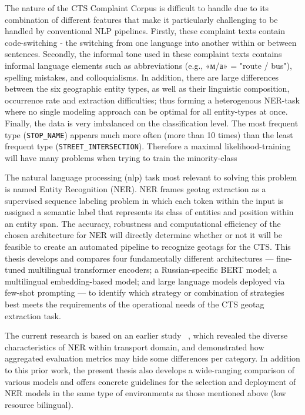 The nature of the CTS Complaint Corpus is difficult to handle due to its combination of different features that make it particularly challenging to be handled by conventional NLP pipelines. Firstly, these complaint texts contain code-switching - the switching from one language into another within or between sentences. Secondly, the informal tone used in these complaint texts contains informal language elements such as abbreviations (e.g., «м/а» = "route / bus"), spelling mistakes, and colloquialisms. In addition, there are large differences between the six geographic entity types, as well as their linguistic composition, occurrence rate and extraction difficulties; thus forming a heterogenous NER-task where no single modeling approach can be optimal for all entity-types at once. Finally, the data is very imbalanced on the classification level. The most frequent type (\texttt{STOP\_NAME}) appears much more often (more than 10 times) than the least frequent type (\texttt{STREET\_INTERSECTION}). Therefore a maximal likelihood-training will have many problems when trying to train the minority-class


The natural language processing (nlp) task most relevant to solving this problem is named Entity Recognition (NER). NER frames geotag extraction as a supervised sequence labeling problem in which each token within the input is assigned a semantic label that represents its class of entities and position within an entity span. The accuracy, robustness and computational efficiency of the chosen architecture for NER will directly determine whether or not it will be feasible to create an automated pipeline to recognize geotags for the CTS. This thesis develops and compares four fundamentally different architectures — fine-tuned multilingual transformer encoders; a Russian-specific BERT model; a multilingual embedding-based model; and large language models deployed via few-shot prompting — to identify which strategy or combination of strategies best meets the requirements of the operational needs of the CTS geotag extraction task.

The current research is based on an earlier study ~\cite{ussenbayeva2026heterogeneous}, which revealed the diverse characteristics of NER within transport domain, and demonstrated how aggregated evaluation metrics may hide some differences per category. In addition to this prior work, the present thesis also develops a wide-ranging comparison of various models and offers concrete guidelines for the selection and deployment of NER models in the same type of environments as those mentioned above (low resource bilingual).



